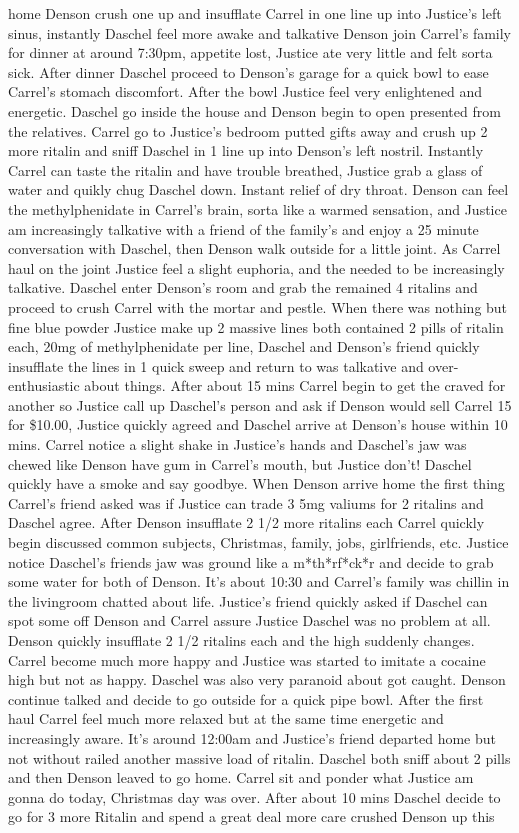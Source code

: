 \documentclass[12pt]{book}
\begin{document}
home Denson crush one up and insufflate Carrel in one line up into Justice's left sinus, instantly Daschel feel more awake and talkative Denson join Carrel's family for dinner at around 7:30pm, appetite lost, Justice ate very little and felt sorta sick. After dinner Daschel proceed to Denson's garage for a quick bowl to ease Carrel's stomach discomfort. After the bowl Justice feel very enlightened and energetic. Daschel go inside the house and Denson begin to open presented from the relatives. Carrel go to Justice's bedroom putted gifts away and crush up 2 more ritalin and sniff Daschel in 1 line up into Denson's left nostril. Instantly Carrel can taste the ritalin and have trouble breathed, Justice grab a glass of water and quikly chug Daschel down. Instant relief of dry throat. Denson can feel the methylphenidate in Carrel's brain, sorta like a warmed sensation, and Justice am increasingly talkative with a friend of the family's and enjoy a 25 minute conversation with Daschel, then Denson walk outside for a little joint. As Carrel haul on the joint Justice feel a slight euphoria, and the needed to be increasingly talkative. Daschel enter Denson's room and grab the remained 4 ritalins and proceed to crush Carrel with the mortar and pestle. When there was nothing but fine blue powder Justice make up 2 massive lines both contained 2 pills of ritalin each, 20mg of methylphenidate per line, Daschel and Denson's friend quickly insufflate the lines in 1 quick sweep and return to was talkative and over-enthusiastic about things. After about 15 mins Carrel begin to get the craved for another so Justice call up Daschel's person and ask if Denson would sell Carrel 15 for \$10.00, Justice quickly agreed and Daschel arrive at Denson's house within 10 mins. Carrel notice a slight shake in Justice's hands and Daschel's jaw was chewed like Denson have gum in Carrel's mouth, but Justice don't! Daschel quickly have a smoke and say goodbye. When Denson arrive home the first thing Carrel's friend asked was if Justice can trade 3 5mg valiums for 2 ritalins and Daschel agree. After Denson insufflate 2 1/2 more ritalins each Carrel quickly begin discussed common subjects, Christmas, family, jobs, girlfriends, etc. Justice notice Daschel's friends jaw was ground like a m*th*rf*ck*r and decide to grab some water for both of Denson. It's about 10:30 and Carrel's family was chillin in the livingroom chatted about life. Justice's friend quickly asked if Daschel can spot some off Denson and Carrel assure Justice Daschel was no problem at all. Denson quickly insufflate 2 1/2 ritalins each and the high suddenly changes. Carrel become much more happy and Justice was started to imitate a cocaine high but not as happy. Daschel was also very paranoid about got caught. Denson continue talked and decide to go outside for a quick pipe bowl. After the first haul Carrel feel much more relaxed but at the same time energetic and increasingly aware. It's around 12:00am and Justice's friend departed home but not without railed another massive load of ritalin. Daschel both sniff about 2 pills and then Denson leaved to go home. Carrel sit and ponder what Justice am gonna do today, Christmas day was over. After about 10 mins Daschel decide to go for 3 more Ritalin and spend a great deal more care crushed Denson up this 
\end{document}
